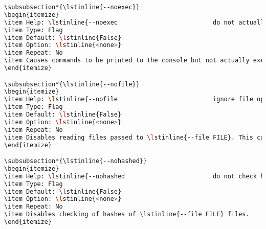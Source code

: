 \begin{snugshade}
\begin{lstlisting}[language=bash]
\subsubsection*{\lstinline{--noexec}}
\begin{itemize}
\item Help: \lstinline{--noexec                          do not actually execute}
\item Type: Flag
\item Default: \lstinline{False}
\item Option: \lstinline{<none>}
\item Repeat: No
\item Causes commands to be printed to the console but not actually executed.
\end{itemize}

\subsubsection*{\lstinline{--nofile}}
\begin{itemize}
\item Help: \lstinline{--nofile                          ignore file options}
\item Type: Flag
\item Default: \lstinline{False}
\item Option: \lstinline{<none>}
\item Repeat: No
\item Disables reading files passed to \lstinline{--file FILE}. This can be useful if a default command line is used.
\end{itemize}

\subsubsection*{\lstinline{--nohashed}}
\begin{itemize}
\item Help: \lstinline{--nohashed                        do not check hashes of unknown files}
\item Type: Flag
\item Default: \lstinline{False}
\item Option: \lstinline{<none>}
\item Repeat: No
\item Disables checking of hashes of \lstinline{--file FILE} files.
\end{itemize}


\end{lstlisting}
\end{snugshade}
